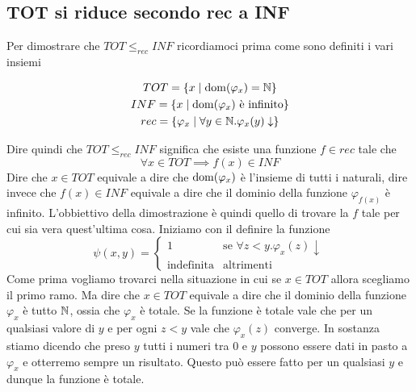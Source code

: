 \subsection{TOT si riduce secondo rec a INF}

Per dimostrare che $TOT \leq_{rec} INF$ ricordiamoci prima
come sono definiti i vari insiemi

\begin{gather*}
	TOT = \{ x \mid \operatorname{dom} (\varphi_x) = \mathbb{N} \} \\
	INF = \{ x \mid \operatorname{dom} (\varphi_x) \text{ è infinito} \} \\
	rec = \{ \varphi_x \mid \forall y \in \mathbb{N} . \varphi_x (y) \downarrow \}
\end{gather*}

Dire quindi che $TOT \leq_{rec} INF$ significa che esiste una funzione
$f \in rec$ tale che
\[ \forall x \in TOT \implies f(x) \in INF \]
Dire che $x \in TOT$ equivale a dire che $\operatorname{dom} (\varphi_x)$ è l'insieme
di tutti i naturali, dire invece che $f(x) \in INF$ equivale a dire che
il dominio della funzione $\varphi_{f(x)}$ è infinito. L'obbiettivo della
dimostrazione è quindi quello di trovare la $f$ tale per cui sia vera
quest'ultima cosa. Iniziamo con il definire la funzione
\[
	\psi (x, y) = \begin{cases}
		1                 & \text{se } \forall z < y .
		\varphi_x(z) \downarrow                        \\
		\text{indefinita} & \text{altrimenti}
	\end{cases}
\]
Come prima vogliamo trovarci nella situazione in cui se $x \in TOT$ allora
scegliamo il primo ramo. Ma dire che $x \in TOT$ equivale a dire che il
dominio della funzione $\varphi_x$ è tutto $\mathbb{N}$, ossia che $\varphi_x$ è
totale. Se la funzione è totale vale che per un qualsiasi valore di $y$ e
per ogni $z < y$ vale che $\varphi_x(z)$ converge. In sostanza stiamo dicendo
che preso $y$ tutti i numeri tra $0$ e $y$ possono essere dati in pasto
a $\varphi_x$ e otterremo sempre un risultato. Questo può essere fatto per
un qualsiasi $y$ e dunque la funzione è totale.

